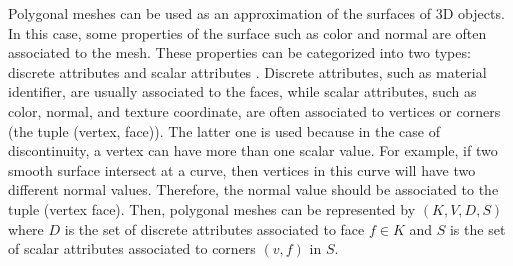 \documentclass[11pt, a4paper]{report}
\begin{document}
    Polygonal meshes can be used as an approximation of the surfaces
    of 3D objects. In this case, some properties of the surface such
    as color and normal are often associated to the mesh. These
    properties can be categorized into two types: discrete attributes
    and scalar attributes \label{property}. Discrete attributes, such
    as material identifier, are usually associated to the faces, while
    scalar attributes, such as color, normal, and texture coordinate,
    are often associated to vertices or corners (the tuple (vertex,
    face)). The latter one is used because in the case of
    discontinuity, a vertex can have more than one scalar value. For
    example, if two smooth surface intersect at a curve, then vertices
    in this curve will have two different normal values. Therefore,
    the normal value should be associated to the tuple (vertex face).
    Then, polygonal meshes can be represented by $(K, V, D, S)$ where
    $D$ is the set of discrete attributes associated to face $f \in
    K$ and $S$ is the set of scalar attributes associated to corners $(v, f)$ in $S$.
    
\end{document}
